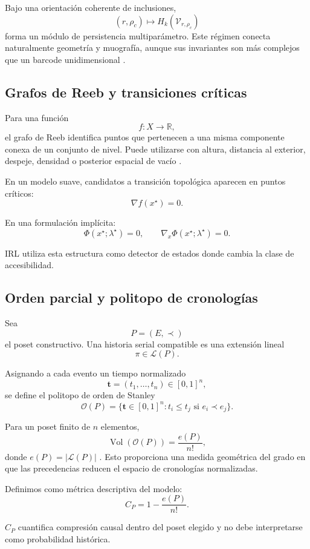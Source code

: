 Bajo una orientación coherente de inclusiones,
\[
(r,\rho_c)
\mapsto
H_k(\mathcal V_{r,\rho_c})
\]
forma un módulo de persistencia multiparámetro. Este régimen conecta naturalmente geometría y muografía, aunque sus invariantes son más complejos que un barcode unidimensional \cite{carlssonzomorodian2009}.

\subsection{Grafos de Reeb y transiciones críticas}

Para una función
\[
f:X\rightarrow\mathbb R,
\]
el grafo de Reeb identifica puntos que pertenecen a una misma componente conexa de un conjunto de nivel. Puede utilizarse con altura, distancia al exterior, despeje, densidad o posterior espacial de vacío \cite{biasotti2008,deywang2022}.

En un modelo suave, candidatos a transición topológica aparecen en puntos críticos:
\[
\nabla f(x^\star)=0.
\]

En una formulación implícita:
\[
\boxed{
\Phi(x^\star;\lambda^\star)=0,
\qquad
\nabla_x\Phi(x^\star;\lambda^\star)=0.
}
\]

IRL utiliza esta estructura como detector de estados donde cambia la clase de accesibilidad.

\subsection{Orden parcial y politopo de cronologías}

Sea
\[
P=(E,\prec)
\]
el poset constructivo. Una historia serial compatible es una extensión lineal
\[
\pi\in\mathcal L(P).
\]

Asignando a cada evento un tiempo normalizado
\[
\mathbf t=(t_1,\ldots,t_n)\in[0,1]^n,
\]
se define el politopo de orden de Stanley
\[
\boxed{
\mathcal O(P)
=
\{
\mathbf t\in[0,1]^n:
t_i\le t_j
\text{ si }e_i\prec e_j
\}.
}
\]

Para un poset finito de \(n\) elementos,
\[
\boxed{
\operatorname{Vol}(\mathcal O(P))
=
\frac{e(P)}{n!},
}
\]
donde \(e(P)=|\mathcal L(P)|\) \cite{stanley1986}. Esto proporciona una medida geométrica del grado en que las precedencias reducen el espacio de cronologías normalizadas.

Definimos como métrica descriptiva del modelo:
\[
C_P
=
1-\frac{e(P)}{n!}.
\]

\(C_P\) cuantifica compresión causal dentro del poset elegido y no debe interpretarse como probabilidad histórica.

